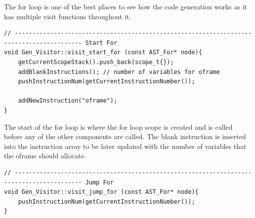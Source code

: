 \documentclass[12pt, a4paper]{report}
\begin{document}
The for loop is one of the best places to see how the code generation works as it has multiple visit functions throughout it.

\begin{verbatim}
// ----------------------------------------------------------------------------------------- Start For
void Gen_Visitor::visit_start_for (const AST_For* node){
    getCurrentScopeStack().push_back(scope_t{});
    addBlankInstructions(); // number of variables for oframe
    pushInstructionNum(getCurrentInstructionNumber());

    addNewInstruction("oframe");
}
\end{verbatim}
The start of the for loop is where the for loop scope is created and is called before any of the other components are called. The blank instruction is inserted into the instruction array to be later updated with the number of variables that the oframe should allocate.

\begin{verbatim}
// ----------------------------------------------------------------------------------------- Jump For
void Gen_Visitor::visit_jump_for (const AST_For* node){
    pushInstructionNum(getCurrentInstructionNumber());
}
\end{verbatim}
\end{document}
